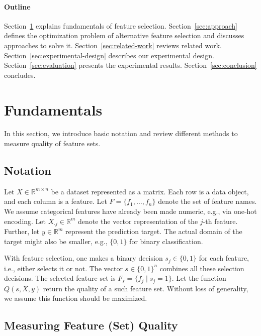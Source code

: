 \documentclass{article}
\theoremstyle{definition}
\begin{document}
\paragraph{Outline}

Section~\ref{sec:fundamentals} explains fundamentals of feature selection.
Section~\ref{sec:approach} defines the optimization problem of alternative feature selection and discusses approaches to solve it.
Section~\ref{sec:related-work} reviews related work.
Section~\ref{sec:experimental-design} describes our experimental design.
Section~\ref{sec:evaluation} presents the experimental results.
Section~\ref{sec:conclusion} concludes.

\section{Fundamentals}
\label{sec:fundamentals}

In this section, we introduce basic notation and review different methods to measure quality of feature sets.

\subsection{Notation}
\label{sec:fundamentals:notation}

Let $X \in \mathbb{R}^{m \times n}$ be a dataset represented as a matrix.
Each row is a data object, and each column is a feature.
Let $F = \{f_1, \dots, f_n\}$ denote the set of feature names.
We assume categorical features have already been made numeric, e.g., via one-hot encoding.
Let $X_{\cdot{}j} \in \mathbb{R}^m$ denote the vector representation of the $j$-th feature.
Further, let $y \in \mathbb{R}^m$ represent the prediction target.
The actual domain of the target might also be smaller, e.g., $\{0,1\}$ for binary classification.

With feature selection, one makes a binary decision $s_j \in \{0,1\}$ for each feature, i.e., either selects it or not.
The vector $s \in \{0,1\}^n$ combines all these selection decisions.
The selected feature set is $F_s = \{f_j \mid s_j=1\}$.
Let the function $Q(s,X,y)$ return the quality of a such feature set.
Without loss of generality, we assume this function should be maximized.

\subsection{Measuring Feature (Set) Quality}
\label{sec:fundamentals:quality}
\end{document}
